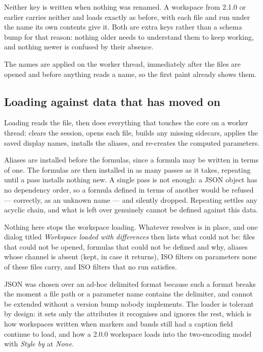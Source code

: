 \documentclass[11pt,a4paper,oneside]{report}
\begin{document}
Neither key is written when nothing was renamed. A workspace from 2.1.0 or
earlier carries neither and loads exactly as before, with each file and run under
the name its own contents give it. Both are extra keys rather than a schema bump
for that reason: nothing older needs to understand them to keep working, and
nothing newer is confused by their absence.

The names are applied on the worker thread, immediately after the files are
opened and before anything reads a name, so the first paint already shows them.

\subsection{Loading against data that has moved on}

Loading reads the file, then does everything that touches the core on a worker
thread: clears the session, opens each file, builds any missing sidecars, applies
the saved display names, installs the aliases, and re-creates the computed
parameters.

Aliases are installed before the formulas, since a formula may be written in
terms of one. The formulas are then installed in as many passes as it takes,
repeating until a pass installs nothing new. A single pass is not enough: a JSON
object has no dependency order, so a formula defined in terms of another would be
refused --- correctly, as an unknown name --- and silently dropped. Repeating
settles any acyclic chain, and what is left over genuinely cannot be defined
against this data.

Nothing here stops the workspace loading. Whatever resolves is in place, and one
dialog titled \emph{Workspace loaded with differences} then lists what could not
be: files that could not be opened, formulas that could not be defined and why,
aliases whose channel is absent (kept, in case it returns), ISO filters on
parameters none of these files carry, and ISO filters that no run satisfies.

JSON was chosen over an ad-hoc delimited format because such a format breaks the
moment a file path or a parameter name contains the delimiter, and cannot be
extended without a version bump nobody implements. The loader is tolerant by
design: it sets only the attributes it recognises and ignores the rest, which is
how workspaces written when markers and bands still had a caption field continue
to load, and how a 2.0.0 workspace loads into the two-encoding model with
\emph{Style by} at \emph{None}.
\end{document}
